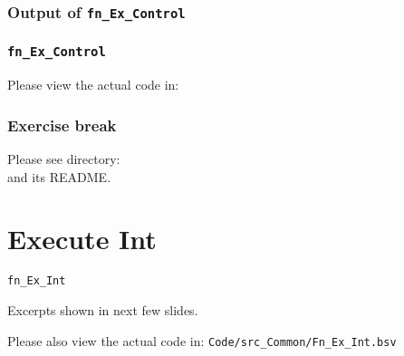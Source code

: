 
\begin{frame}[fragile]
\frametitle{Output of {\tt fn\_Ex\_Control}}

\footnotesize


\end{frame}


\begin{frame}
\frametitle{{\tt fn\_Ex\_Control}}

\footnotesize

\begin{center}\large
 Please view the actual code in: 
\end{center}

\end{frame}


\begin{frame}
\frametitle{\EmojiExercise \hmm Exercise break}

Please see directory:  \\
and its README.

\end{frame}


\section{Execute Int}

\begin{frame}[fragile]

\begin{center}
  {\LARGE\tt fn\_Ex\_Int}

  \vspace{5ex}

  Excerpts shown in next few slides.

  Please also view the actual code in:
  {\tt Code/src\_Common/Fn\_Ex\_Int.bsv}

\end{center}

\end{frame}

